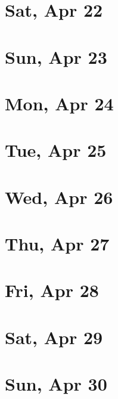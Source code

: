 	\section{Sat, Apr 22}
		
	\section{Sun, Apr 23}
		
	\section{Mon, Apr 24}
		
	\section{Tue, Apr 25}
		
	\section{Wed, Apr 26}
		
	\section{Thu, Apr 27}
		
	\section{Fri, Apr 28}
		
	\section{Sat, Apr 29}
		
	\section{Sun, Apr 30}
		
